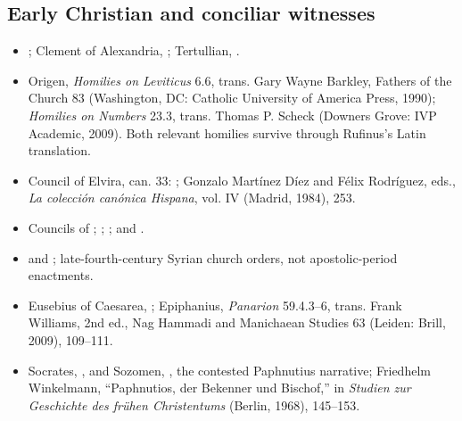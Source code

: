 \subsection{Early Christian and conciliar witnesses}

\begin{itemize}
\item {}; Clement of Alexandria, ; Tertullian, .
\item Origen, \emph{Homilies on Leviticus} 6.6, trans. Gary Wayne Barkley, Fathers of the Church 83 (Washington, DC: Catholic University of America Press, 1990); \emph{Homilies on Numbers} 23.3, trans. Thomas P. Scheck (Downers Grove: IVP Academic, 2009). Both relevant homilies survive through Rufinus's Latin translation.
\item Council of Elvira, can. 33: ; Gonzalo Martínez Díez and Félix Rodríguez, eds., \emph{La colección canónica Hispana}, vol. IV (Madrid, 1984), 253.
\item Councils of ; ; ; and .
\item {} and ; late-fourth-century Syrian church orders, not apostolic-period enactments.
\item Eusebius of Caesarea, ; Epiphanius, \emph{Panarion} 59.4.3--6, trans. Frank Williams, 2nd ed., Nag Hammadi and Manichaean Studies 63 (Leiden: Brill, 2009), 109--111.
\item Socrates, , and Sozomen, , the contested Paphnutius narrative; Friedhelm Winkelmann, “Paphnutios, der Bekenner und Bischof,” in \emph{Studien zur Geschichte des frühen Christentums} (Berlin, 1968), 145--153.

\end{itemize}
